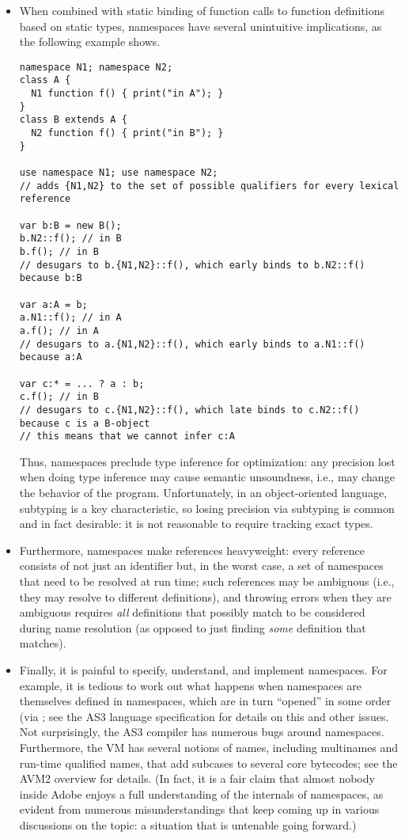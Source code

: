 \begin{itemize}

\item When combined
with static binding of function calls to function definitions based on
static types, namespaces have several unintuitive implications, as the
following example shows.


\begin{verbatim}
namespace N1; namespace N2;
class A {
  N1 function f() { print("in A"); }
}
class B extends A {
  N2 function f() { print("in B"); }
}

use namespace N1; use namespace N2;
// adds {N1,N2} to the set of possible qualifiers for every lexical reference

var b:B = new B();
b.N2::f(); // in B
b.f(); // in B
// desugars to b.{N1,N2}::f(), which early binds to b.N2::f() because b:B

var a:A = b;
a.N1::f(); // in A
a.f(); // in A
// desugars to a.{N1,N2}::f(), which early binds to a.N1::f() because a:A

var c:* = ... ? a : b;
c.f(); // in B
// desugars to c.{N1,N2}::f(), which late binds to c.N2::f() because c is a B-object
// this means that we cannot infer c:A
\end{verbatim}

Thus, namespaces preclude type inference for optimization:
any precision lost when doing type inference may cause semantic
unsoundness, i.e., may change the behavior of the
program. Unfortunately, in an object-oriented language, subtyping
is a key characteristic, so losing precision via subtyping is common and in fact
desirable: it is not reasonable to require tracking exact types.

\item Furthermore, namespaces make references heavyweight: every reference consists of
not just an identifier but, in the worst case, a set of namespaces
that need to be resolved at run time; such references may be ambiguous
(i.e., they may resolve to different definitions), and throwing errors
when they are ambiguous requires \emph{all} definitions that possibly
match to be
considered during name resolution (as opposed to just finding
\emph{some} definition that matches).

\item Finally, it is painful to specify, understand, and implement
  namespaces. For example, it is tedious to work out what happens when
  namespaces are themselves defined in namespaces, which are in turn ``opened''
  in some order (via ; see the AS3 language specification
  for details on this and other issues. Not surprisingly, the AS3 compiler has
  numerous bugs around namespaces. Furthermore, the VM has several notions of
  names, including multinames and run-time qualified names, that add subcases to
  several core bytecodes; see the AVM2 overview for details. (In fact, it is a
  fair claim that almost nobody inside Adobe enjoys a full understanding of the
  internals of namespaces, as evident from numerous misunderstandings that keep
  coming up in various discussions on the topic: a situation that is untenable
  going forward.)
\end{itemize}

